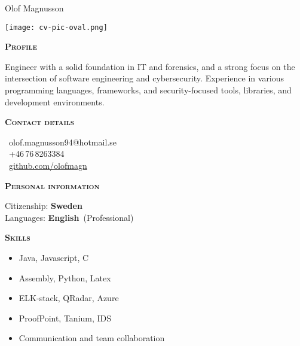 \documentclass[11pt, a4paper]{article}
\newcommand{\headleft}[1]{\vspace*{3ex}\textsc{\textbf{#1}}\par%
    \vspace*{-1.5ex}\hrulefill\par\vspace*{0.7ex}}
\begin{document}
\setlength{\topskip}{0pt}
\setlength{\parindent}{0pt}
\setlength{\parskip}{0pt}
\setlength{\fboxsep}{0pt}
\pagestyle{empty}
\raggedbottom

\begin{minipage}[t]{0.33\textwidth} %
\colorbox{cvblue}{\begin{minipage}[t][5mm][t]{\textwidth}\null\hfill\null\end{minipage}}

\vspace{-.2ex} %
\colorbox{cvblue!90}{\color{white}  %
\textwidth\relax%
\begin{minipage}[t][293mm][t]{0.82\textwidth}
\raggedright
\vspace*{2.5ex}

\Large Olof Magnusson \normalsize 

\null\hfill\texttt{[image: cv-pic-oval.png]}\hfill\null

\vspace*{0.5ex} %

\headleft{Profile}
Engineer with a solid foundation in IT and forensics, and a strong focus on the intersection of software engineering and cybersecurity. Experience in various programming languages, frameworks, and security-focused tools, libraries, and development environments.

\headleft{Contact details}
\small %
\MVAt\ {\small olof.magnusson94@hotmail.se} \\[0.4ex]
\Mobilefone \ +46\,76\,8263384 \\[0.5ex]
\Mundus\ \href{https://github.com/olofmagn}{github.com/olofmagn} \\[0.1ex]
\normalsize

\headleft{Personal information}
Citizenship: \textbf{Sweden} \\[0.5ex]
Languages: \textbf{English}~(Professional)

\headleft{Skills}
\begin{itemize}
\item Java, Javascript, C
\item Assembly, Python, Latex
\item ELK-stack, QRadar, Azure
\item ProofPoint, Tanium, IDS
\item Communication and team collaboration
\end{itemize} 


\end{minipage}}
\end{minipage}
\end{document}
